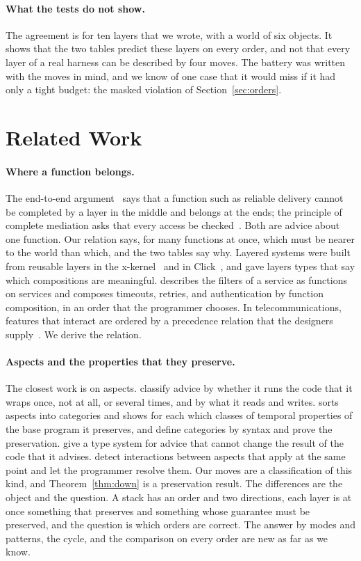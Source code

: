 \documentclass[acmsmall,nonacm,screen]{acmart}
\begin{document}
\paragraph{What the tests do not show.} The agreement is for ten layers that we wrote, with
a world of six objects. It shows that the two tables predict these layers on every order,
and not that every layer of a real harness can be described by four moves. The battery was
written with the moves in mind, and we know of one case that it would miss if it had only a
tight budget: the masked violation of Section~\ref{sec:orders}.

\section{Related Work}
\label{sec:related}

\paragraph{Where a function belongs.} The end-to-end argument~\cite{saltzer1984} says that a
function such as reliable delivery cannot be completed by a layer in the middle and belongs
at the ends; the principle of complete mediation asks that every access be
checked~\cite{saltzer1975}. Both are advice about one function. Our relation says, for many
functions at once, which must be nearer to the world than which, and the two tables say why.
Layered systems were built from reusable layers in the x-kernel~\cite{hutchinson1991} and in
Click~\cite{kohler2000}, and \citet{batory1992} gave layers types that say which
compositions are meaningful. \citet{eriksen2013} describes the filters of a service as
functions on services and composes timeouts, retries, and authentication by function
composition, in an order that the programmer chooses. In telecommunications, features that interact are ordered by a precedence
relation that the designers supply~\cite{jackson1998}. We derive the relation.

\paragraph{Aspects and the properties that they preserve.} The closest work is on aspects.
\citet{rinard2004} classify advice by whether it runs the code that it wraps once, not at
all, or several times, and by what it reads and writes. \citet{katz2006} sorts aspects into
categories and shows for each which classes of temporal properties of the base program it
preserves, and \citet{djoko2012} define categories by syntax and prove the preservation.
\citet{dantas2006} give a type system for advice that cannot change the result of the code
that it advises. \citet{douence2004} detect interactions between aspects that apply at the
same point and let the programmer resolve them. Our moves are a classification of this kind,
and Theorem~\ref{thm:down} is a preservation result. The differences are the object and the
question. A stack has an order and two directions, each layer is at once something that
preserves and something whose guarantee must be preserved, and the question is which orders
are correct. The answer by modes and patterns, the cycle, and the comparison on every order
are new as far as we know.
\end{document}
